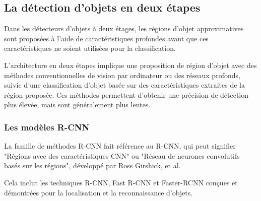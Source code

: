 \subsection{La détection d'objets en deux étapes}
 
Dans les détecteurs d'objets à deux étages, les régions d'objet approximatives sont proposées à l'aide de caractéristiques profondes avant que ces caractéristiques ne soient utilisées pour la classification.

     L'architecture en deux étapes implique une proposition de région d'objet avec des méthodes conventionnelles de vision par ordinateur ou des réseaux profonds, suivie d'une classification d'objet basée sur des caractéristiques extraites de la région proposée.   
     Ces méthodes permettent d'obtenir une précision de détection  plus élevée, mais sont généralement plus lentes. 
     
    
\subsubsection{Les modèles R-CNN}  
La famille de méthodes R-CNN fait référence au R-CNN, qui peut signifier "Régions avec des caractéristiques CNN" ou "Réseau de neurones convolutifs basés sur les régions", développé par Ross Girshick, et al.

Cela inclut les techniques R-CNN, Fast R-CNN et Faster-RCNN conçues et démontrées pour la localisation et la reconnaissance d'objets.

